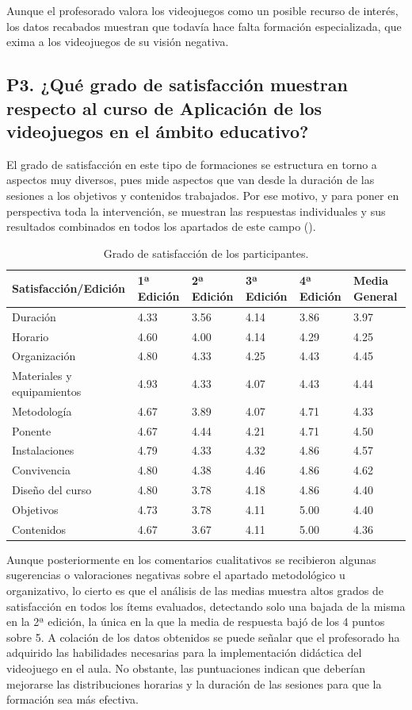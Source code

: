 \documentclass[spanish]{textolivre}
\begin{document}
Aunque el profesorado valora los videojuegos como un posible recurso de interés, los datos recabados muestran que todavía hace falta formación especializada, que exima a los videojuegos de su visión negativa.

\subsection{P3. ¿Qué grado de satisfacción muestran respecto al curso de Aplicación de los videojuegos en el ámbito educativo?}\label{sec-secoes}
El grado de satisfacción en este tipo de formaciones se estructura en torno a aspectos muy diversos, pues mide aspectos que van desde la duración de las sesiones a los objetivos y contenidos trabajados. Por ese motivo, y para poner en perspectiva toda la intervención, se muestran las respuestas individuales y sus resultados combinados en todos los apartados de este campo ().

\begin{table}[htbp]
\caption{Grado de satisfacción de los participantes.}
\label{tbl2}
\centering
\begin{tabular}{llllll}
\toprule
Satisfacción/Edición & 1ª Edición & 2ª Edición & 3ª Edición & 4ª Edición & Media General \\ 
 \midrule
Duración & 4.33 & 3.56 & 4.14 & 3.86 & 3.97 \\
Horario & 4.60 & 4.00 & 4.14 & 4.29 & 4.25 \\
Organización & 4.80 & 4.33 & 4.25 & 4.43 & 4.45 \\
Materiales y equipamientos & 4.93 & 4.33 & 4.07 & 4.43 & 4.44 \\
Metodología & 4.67 & 3.89 & 4.07 & 4.71 & 4.33 \\
Ponente & 4.67 & 4.44 & 4.21 & 4.71 & 4.50 \\
Instalaciones & 4.79 & 4.33 & 4.32 & 4.86 & 4.57 \\
Convivencia & 4.80 & 4.38 & 4.46 & 4.86 & 4.62 \\
Diseño del curso & 4.80 & 3.78 & 4.18 & 4.86 & 4.40 \\
Objetivos & 4.73 & 3.78 & 4.11 & 5.00 & 4.40 \\
Contenidos & 4.67 & 3.67 & 4.11 & 5.00 & 4.36  \\
\bottomrule
\end{tabular}
\end{table}

Aunque posteriormente en los comentarios cualitativos se recibieron algunas sugerencias o valoraciones negativas sobre el apartado metodológico u organizativo, lo cierto es que el análisis de las medias muestra altos grados de satisfacción en todos los ítems evaluados, detectando solo una bajada de la misma en la 2ª edición, la única en la que la media de respuesta bajó de los 4 puntos sobre 5. A colación de los datos obtenidos se puede señalar que el profesorado ha adquirido las habilidades necesarias para la implementación didáctica del videojuego en el aula. No obstante, las puntuaciones indican que deberían mejorarse las distribuciones horarias y la duración de las sesiones para que la formación sea más efectiva.
\end{document}

